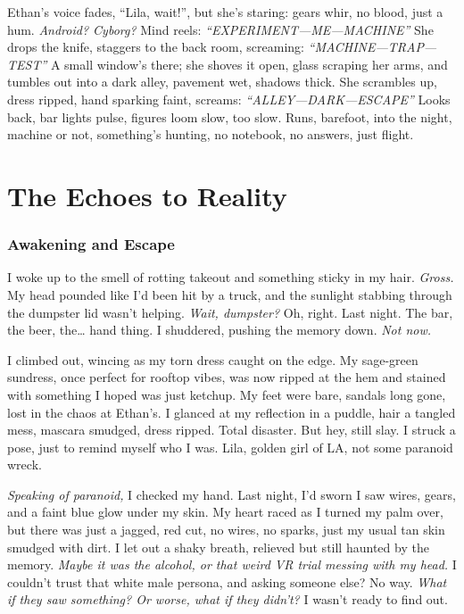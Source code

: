 \documentclass[12pt]{article} %
\begin{document}
\textnormal{Ethan}’s voice fades, “Lila, wait!”, but she’s staring: gears whir, no blood, just a hum. \textit{Android? Cyborg?} Mind reels: \textit{“EXPERIMENT—ME—MACHINE”} She drops the knife, staggers to the back room, screaming: \textit{“MACHINE—TRAP—TEST”} A small window’s there; she shoves it open, glass scraping her arms, and tumbles out into a dark alley, pavement wet, shadows thick. She scrambles up, dress ripped, hand sparking faint, screams: \textit{“ALLEY—DARK—ESCAPE”} Looks back, bar lights pulse, figures loom slow, too slow. Runs, barefoot, into the night, machine or not, something’s hunting, no notebook, no answers, just flight.

\part{The Echoes to Reality}

\section{Awakening and Escape}

I woke up to the smell of rotting takeout and something sticky in my hair. \textit{Gross.} My head pounded like I’d been hit by a truck, and the sunlight stabbing through the dumpster lid wasn’t helping. \textit{Wait, dumpster?} Oh, right. Last night. The bar, the beer, the… hand thing. I shuddered, pushing the memory down. \textit{Not now.}

I climbed out, wincing as my torn dress caught on the edge. My sage-green sundress, once perfect for rooftop vibes, was now ripped at the hem and stained with something I hoped was just ketchup. My feet were bare, sandals long gone, lost in the chaos at \textnormal{Ethan}’s. I glanced at my reflection in a puddle, hair a tangled mess, mascara smudged, dress ripped. Total disaster. But hey, still slay. I struck a pose, just to remind myself who I was. \textnormal{Lila}, golden girl of LA, not some paranoid wreck.

\textit{Speaking of paranoid,} I checked my hand. Last night, I’d sworn I saw wires, gears, and a faint blue glow under my skin. My heart raced as I turned my palm over, but there was just a jagged, red cut, no wires, no sparks, just my usual tan skin smudged with dirt. I let out a shaky breath, relieved but still haunted by the memory. \textit{Maybe it was the alcohol, or that weird VR trial messing with my head.} I couldn’t trust that white male persona, and asking someone else? No way. \textit{What if they saw something? Or worse, what if they didn’t?} I wasn’t ready to find out.
\end{document}
